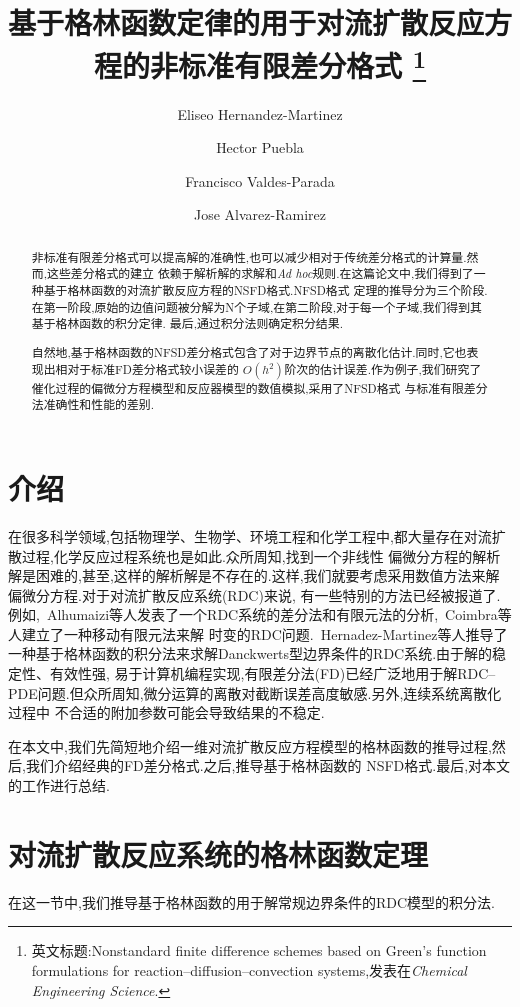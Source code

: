 \documentclass[a4paper,cs4size,adobefonts,cm-default,no-math]{ctexart}
\begin{document}
\title{\kaishu 基于格林函数定律的用于对流扩散反应方程的非标准有限差分格式
      \footnote{英文标题:Nonstandard finite difference schemes based on Green's function
formulations for reaction--diffusion--convection systems,发表在\textit{Chemical Engineering Science}.}}
\author{Eliseo Hernandez-Martinez \and Hector Puebla \and Francisco Valdes-Parada \and Jose Alvarez-Ramirez}
\date{}
\maketitle
\begin{abstract}
非标准有限差分格式可以提高解的准确性,也可以减少相对于传统差分格式的计算量.然而,这些差分格式的建立
依赖于解析解的求解和\textit{Ad hoc}规则.在这篇论文中,我们得到了一种基于格林函数的对流扩散反应方程的NSFD格式.NFSD格式
定理的推导分为三个阶段.在第一阶段,原始的边值问题被分解为N个子域,在第二阶段,对于每一个子域,我们得到其基于格林函数的积分定律.
最后,通过积分法则确定积分结果.\par
自然地,基于格林函数的NFSD差分格式包含了对于边界节点的离散化估计.同时,它也表现出相对于标准FD差分格式较小误差的
$O(h^2)$阶次的估计误差.作为例子,我们研究了催化过程的偏微分方程模型和反应器模型的数值模拟,采用了NFSD格式
与标准有限差分法准确性和性能的差别.
\end{abstract}
\thispagestyle{empty}
\newpage
\section{介绍}
在很多科学领域,包括物理学、生物学、环境工程和化学工程中,都大量存在对流扩散过程,化学反应过程系统也是如此.众所周知,找到一个非线性
偏微分方程的解析解是困难的,甚至,这样的解析解是不存在的.这样,我们就要考虑采用数值方法来解偏微分方程.对于对流扩散反应系统(RDC)来说,
有一些特别的方法已经被报道了.例如,~Alhumaizi等人发表了一个RDC系统的差分法和有限元法的分析,~Coimbra等人建立了一种移动有限元法来解
时变的RDC问题.~Hernadez-Martinez等人推导了一种基于格林函数的积分法来求解Danckwerts型边界条件的RDC系统.由于解的稳定性、有效性强,
易于计算机编程实现,有限差分法(FD)已经广泛地用于解RDC--PDE问题.但众所周知,微分运算的离散对截断误差高度敏感.另外,连续系统离散化过程中
不合适的附加参数可能会导致结果的不稳定.\par
在本文中,我们先简短地介绍一维对流扩散反应方程模型的格林函数的推导过程,然后,我们介绍经典的FD差分格式.之后,推导基于格林函数的
NSFD格式.最后,对本文的工作进行总结.
\section{对流扩散反应系统的格林函数定理}\label{sec:2}
在这一节中,我们推导基于格林函数的用于解常规边界条件的RDC模型的积分法.\par
\end{document}
